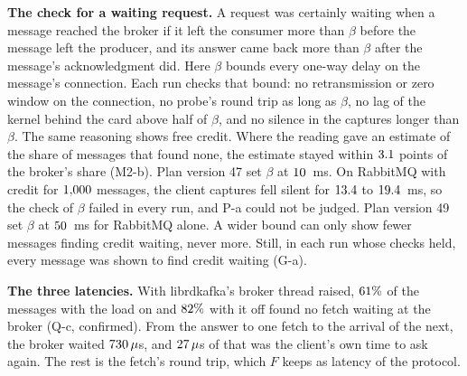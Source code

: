 \documentclass[10pt,journal,onecolumn]{IEEEtran}
\begin{document}
\textbf{The check for a waiting request.} A request was certainly waiting when a message reached
the broker if it left the consumer more than $\beta$ before the message left the producer, and
its answer came back more than $\beta$ after the message's acknowledgment did. Here $\beta$ bounds
every one-way delay on the message's connection. Each run checks that bound: no retransmission or zero window on
the connection, no probe's round trip as long as $\beta$, no lag of the kernel behind the card
above half of $\beta$, and no silence in the captures longer than $\beta$. The same reasoning shows
free credit. Where the reading gave an estimate of the share of messages that found none, the estimate stayed within $3.1$ points of the broker's share (M2-b). Plan version 47 set $\beta$ at $10$~ms. On RabbitMQ with credit for
$1{,}000$ messages, the client captures fell silent for $13.4$ to
$19.4$~ms, so the check of $\beta$ failed in every run, and P-a could not be judged.
Plan version 49 set $\beta$ at $50$~ms for RabbitMQ alone. A wider bound can only show
fewer messages finding credit waiting, never more. Still, in each run whose checks held, every message was shown to find
credit waiting (G-a).

\textbf{The three latencies.} With librdkafka's broker thread raised, $61\%$ of the
messages with the load on and $82\%$ with it off found no fetch waiting at the broker
(Q-c, confirmed). From the answer to one fetch to the arrival of the next, the broker waited
$730\,\mu$s, and $27\,\mu$s of that was the client's own time to ask again. The
rest is the fetch's round trip, which $F$ keeps as latency of the protocol.
\end{document}

